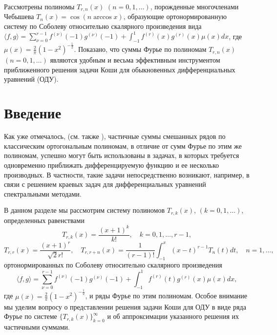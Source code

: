 Рассмотрены полиномы $T_{r,n}(x)$ $(n=0,1,\ldots)$, порожденные многочленами Чебышева $T_{n}(x)=\cos( n\arccos x)$, образующие ортонормированную систему по Соболеву относительно скалярного произведения
вида $\langle f,g\rangle=\sum_{\nu=0}^{r-1}f^{(\nu)}(-1)g^{(\nu)}(-1)+\int_{-1}^{1}f^{(r)}(x)g^{(r)}(x)\mu(x)dx$,
где $\mu(x)=\frac2\pi(1-x^2)^{-\frac12}$. Показано, что суммы Фурье по полиномам $T_{r,n}(x)$ $(n=0,1,\ldots)$ являются удобным и весьма эффективным инструментом приближенного решения задачи Коши для обыкновенных дифференциальных уравнений (ОДУ).


\section{Введение}

Как уже отмечалось, (см. также \cite{du2018cheb-Shar11,du2018cheb-Shar12,du2018cheb-Shar13,du2018cheb-Shar14,du2018cheb-Shar15,du2018cheb-Shar16,du2018cheb-Shar17,du2018cheb-Shar18}), частичные суммы смешанных рядов по классическим ортогональным полиномам, в отличие от сумм Фурье по этим же полиномам, успешно могут быть использованы в задачах, в которых требуется одновременно приближать дифференцируемую функцию и ее несколько производных. В частности, такие задачи непосредственно возникают, например, в связи с решением краевых задач для дифференциальных уравнений спектральными методами.

В данном разделе мы рассмотрим систему полиномов $T_{r,k}(x)$,  $(k=0,1,\ldots)$, определенных равенствами
\begin{equation}\label{du2018cheb-1.4}
T_{r,k}(x) =\frac{(x+1)^k}{k!}, \quad k=0,1,\ldots, r-1,
\end{equation}
\begin{equation}\label{du2018cheb-1.5}
T_{r,r}(x) =\frac{(x+1)^r}{\sqrt{2}r!},\quad T_{r,r+n}(x) =\frac{1}{(r-1)!}\int_{-1}^x(x-t)^{r-1}T_{n}(t)dt, \quad n=1,\ldots,
\end{equation}
ортонормированных по Соболеву относительно скалярного произведения
\begin{equation}\label{du2018cheb-1.3}
\langle f,g\rangle=\sum_{\nu=0}^{r-1}f^{(\nu)}(-1)g^{(\nu)}(-1)+\int_{-1}^{1}f^{(r)}(t)g^{(r)}(x)\mu(x)dx,
\end{equation}
где $\mu(x)=\frac2\pi(1-x^2)^{-\frac12}$, и ряды Фурье по этим полиномам. Особое внимание мы уделим вопросу о представлении  решения задачи Коши для ОДУ  в виде ряда Фурье по системе $\{T_{r,k}(x)\}_{k=0}^\infty$  и об аппроксимации указанного решения их частичными суммами.


